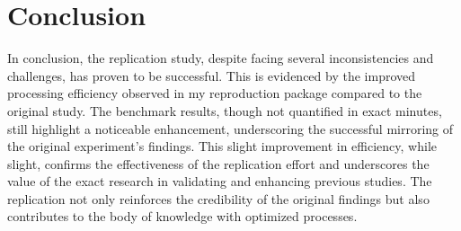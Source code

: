 \documentclass[sigconf, nonacm]{acmart}
\begin{document}
\section{\textbf{Conclusion }}

In conclusion, the replication study, despite facing several inconsistencies and challenges, has proven to be successful. This is evidenced by the improved processing efficiency observed in my reproduction package compared to the original study. The benchmark results, though not quantified in exact minutes, still highlight a noticeable enhancement, underscoring the successful mirroring of the original experiment's findings. This slight improvement in efficiency, while slight, confirms the effectiveness of the replication effort and underscores the value of the exact research in validating and enhancing previous studies. The replication not only reinforces the credibility of the original findings but also contributes to the body of knowledge with optimized processes.







\end{document}
